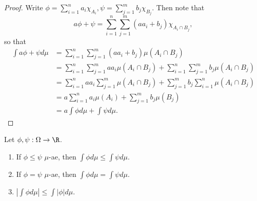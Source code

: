 \documentclass[stat901]{subfiles}
\begin{document}
    \begin{proof}
        Write $\phi = \sum^{n}_{i=1} a_i\chi_{A_i}, \psi = \sum^{m}_{j=1} b_j\chi_{B_j}$. Then note that
        \begin{equation*}
            a\phi+\psi = \sum^{n}_{i=1}\sum^{m}_{j=1} \left( aa_i+b_j \right) \chi_{A_i\cap B_j} ,
        \end{equation*}
        so that
        \begin{equation*}
            \begin{aligned}
                \int a\phi+\psi d\mu & = \sum^{n}_{i=1}\sum^{m}_{j=1} \left( aa_i+b_j \right) \mu\left( A_i\cap B_j \right) \\
                                   & = \sum^{n}_{i=1} \sum^{m}_{j=1} aa_i\mu\left( A_i\cap B_j \right) + \sum^{n}_{i=1}\sum^{m}_{j=1}b_j\mu\left( A_i\cap B_j \right) \\
                                   & = \sum^{n}_{i=1}aa_i \sum^{m}_{j=1} \mu\left( A_i\cap B_j \right) + \sum^{m}_{j=1}b_j \sum^{n}_{i=1}\mu\left( A_i\cap B_j \right) \\
                                   & = a\sum^{n}_{i=1} a_i\mu\left( A_i \right) + \sum^{m}_{j=1} b_j\mu\left( B_j \right) \\
                                   & = a\int\phi d\mu + \int\psi d\mu.
            \end{aligned} 
        \end{equation*}
    \end{proof}

    \clearpage

    \begin{lemma}{}
        Let $\phi,\psi:\Omega\to\R$.
        \begin{enumerate}
            \item If $\phi\leq\psi$ $\mu$-ae, then $\int\phi d\mu\leq \int\psi d\mu$.
            \item If $\phi=\psi$ $\mu$-ae, then $\int\phi d\mu=\int \psi d\mu$.
            \item $\left| \int\phi d\mu \right| \leq \int\left| \phi \right| d\mu$.
        \end{enumerate}
    \end{lemma}
\end{document}
